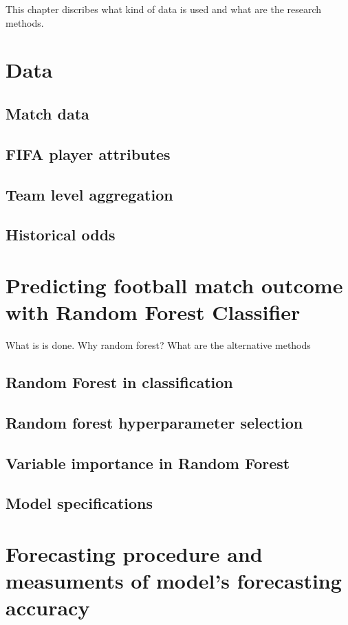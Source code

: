 This chapter discribes what kind of data is used and what are the research methods.

\section{Data}
\subsection{Match data}
\subsection{FIFA player attributes}
\subsection{Team level aggregation}
\subsection{Historical odds}

\section{Predicting football match outcome with Random Forest Classifier}
What is is done. Why random forest? What are the alternative methods
\subsection{Random Forest in classification}
\subsection{Random forest hyperparameter selection}
\subsection{Variable importance in Random Forest}
\subsection{Model specifications}
\section{Forecasting procedure and measuments of model's forecasting accuracy}
